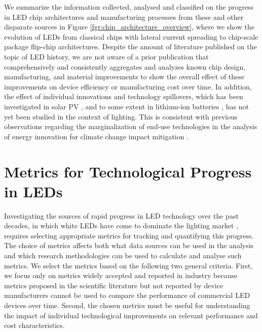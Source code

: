 \documentclass[journal=jacsat,manuscript=article]{achemso}
\begin{document}
We summarize the information collected, analysed and classified on the progress in LED chip architectures and manufacturing processes from these and other disparate sources in Figure \ref{fgr:chip_architecture_overview}, where we show the evolution of LEDs from classical chips with lateral current spreading to chip-scale package flip-chip architectures. Despite the amount of literature published on the topic of LED history, we are not aware of a prior publication that comprehensively and consistently aggregates and analyzes known chip design, manufacturing, and material improvements to show the overall effect of these improvements on device efficiency or manufacturing cost over time. In addition, the effect of individual innovations and technology spillovers, which has been investigated in solar PV \cite{kavlak2018evaluating}\cite{kolesnikov2020novel}\cite{nemet2019solar}, and to some extent in lithium-ion batteries \cite{Stephan2021}, has not yet been studied in the context of lighting. This is consistent with previous observations regarding the marginalization of end-use technologies in the analysis of energy innovation for climate change impact mitigation \cite{Wilson2012}\cite{Creutzig2018}.

\section{Metrics for Technological Progress in LEDs}

Investigating the sources of rapid progress in LED technology over the past decades, in which white LEDs have come to dominate the lighting market \cite{zissis2021}, requires selecting appropriate metrics for tracking and quantifying this progress. The choice of metrics affects both what data sources can be used in the analysis and which research methodologies can be used to calculate and analyse such metrics. We select the metrics based on the following two general criteria. First, we focus only on metrics widely accepted and reported in industry because metrics proposed in the scientific literature but not reported by device manufacturers cannot be used to compare the performance of commercial LED devices over time. Second, the chosen metrics must be useful for understanding the impact of individual technological improvements on relevant performance and cost characteristics.
\end{document}
